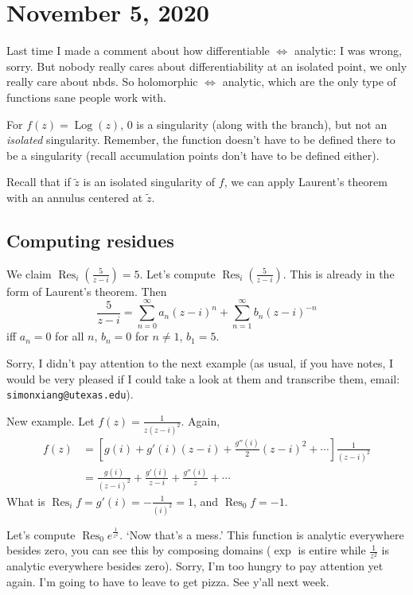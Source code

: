 \section{November 5, 2020}
Last time I made a comment about how differentiable $\iff$ analytic: I was wrong, sorry. But nobody really cares about differentiability at an isolated point, we only really care about nbds. So holomorphic $\iff $ analytic, which are the only type of functions sane people work with.
\begin{note}
    For $f(z)=\operatorname{Log}(z)$, $0$ is a singularity (along with the branch), but not an \emph{isolated} singularity. Remember, the function doesn't have to be defined there to be a singularity (recall accumulation points don't have to be defined either).
\end{note}
Recall that if $\widetilde z$ is an isolated singularity of $f$, we can apply Laurent's theorem with an annulus centered at $\widetilde z$. 
\subsection{Computing residues}
\begin{example}
    We claim $\operatorname{R es}_i \left( \frac{5}{z-i} \right) =5$. Let's compute  $\operatorname{Res}_i  \left( \frac{5}{z-i} \right) $. This is already in the form of Laurent's theorem. Then \[
        \frac{5}{z-i}=\sum_{n=0}^{\infty} a_n (z-i)^n +\sum_{n=1}^{\infty} b_n (z-i)^{-n}
    \] iff $a_n =0$ for all $n$, $b_n =0$ for $n\neq 1$, $b_1=5$.
\end{example}
Sorry, I didn't pay attention to the next example (as usual, if you have notes, I would be very pleased if I could take a look at them and transcribe them, email: \texttt{simonxiang@utexas.edu}).
\begin{example}
    New example. Let $f(z)=\frac{1}{z(z-i)^2}$. Again, 
    \begin{align*}
        f(z)&=\left[ g(i)+g'(i)(z-i)+\frac{g''(i)}{2}(z-i)^2+\cdots  \right] \frac{1}{(z-i)^2}\\
            &=\frac{g(i)}{(z-i)^2}+\frac{g'(i)}{z-i}+\frac{g''(i)}{z}+\cdots 
    \end{align*}
    What is $\operatorname{R es}_i f=g'(i)=-\frac{1}{(i)^2}=1$, and $\operatorname{R es}_0 f=-1$.
\end{example}
\begin{example}
    Let's compute $\operatorname{R es}_0 e^{\frac{1}{z^2}}$. `Now that's a mess.' This function is analytic everywhere besides zero, you can see this by composing domains ($\exp$ is entire while $\frac{1}{z^2}$ is analytic everywhere besides zero). Sorry, I'm too hungry to pay attention yet again. I'm going to have to leave to get pizza. See y'all next week.
\end{example}
